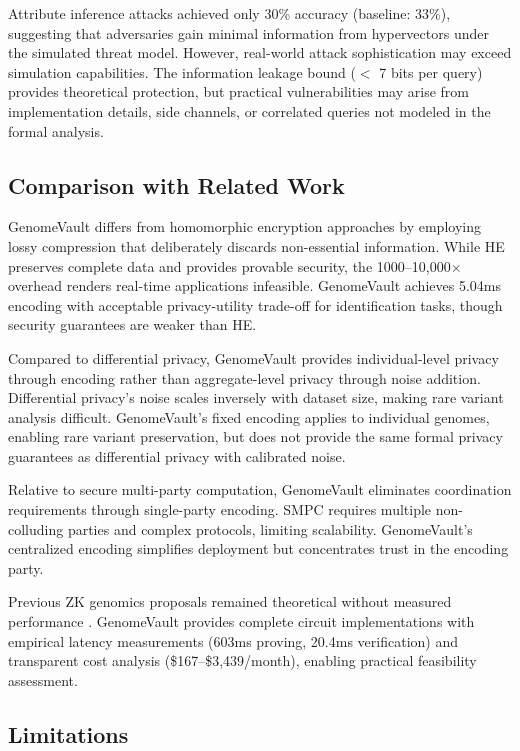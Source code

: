 \documentclass[11pt,letterpaper]{article}
\begin{document}
Attribute inference attacks achieved only 30\% accuracy (baseline: 33\%), suggesting that adversaries gain minimal information from hypervectors under the simulated threat model. However, real-world attack sophistication may exceed simulation capabilities. The information leakage bound ($<$ 7 bits per query) provides theoretical protection, but practical vulnerabilities may arise from implementation details, side channels, or correlated queries not modeled in the formal analysis.

\subsection{Comparison with Related Work}

GenomeVault differs from homomorphic encryption approaches by employing lossy compression that deliberately discards non-essential information. While HE preserves complete data and provides provable security, the 1000--10,000$\times$ overhead renders real-time applications infeasible. GenomeVault achieves 5.04ms encoding with acceptable privacy-utility trade-off for identification tasks, though security guarantees are weaker than HE.

Compared to differential privacy, GenomeVault provides individual-level privacy through encoding rather than aggregate-level privacy through noise addition. Differential privacy's noise scales inversely with dataset size, making rare variant analysis difficult. GenomeVault's fixed encoding applies to individual genomes, enabling rare variant preservation, but does not provide the same formal privacy guarantees as differential privacy with calibrated noise.

Relative to secure multi-party computation, GenomeVault eliminates coordination requirements through single-party encoding. SMPC requires multiple non-colluding parties and complex protocols, limiting scalability. GenomeVault's centralized encoding simplifies deployment but concentrates trust in the encoding party.

Previous ZK genomics proposals remained theoretical without measured performance \cite{bogatyy2020,demmler2019}. GenomeVault provides complete circuit implementations with empirical latency measurements (603ms proving, 20.4ms verification) and transparent cost analysis (\$167--\$3,439/month), enabling practical feasibility assessment.

\subsection{Limitations}
\label{sec:limitations}
\end{document}
